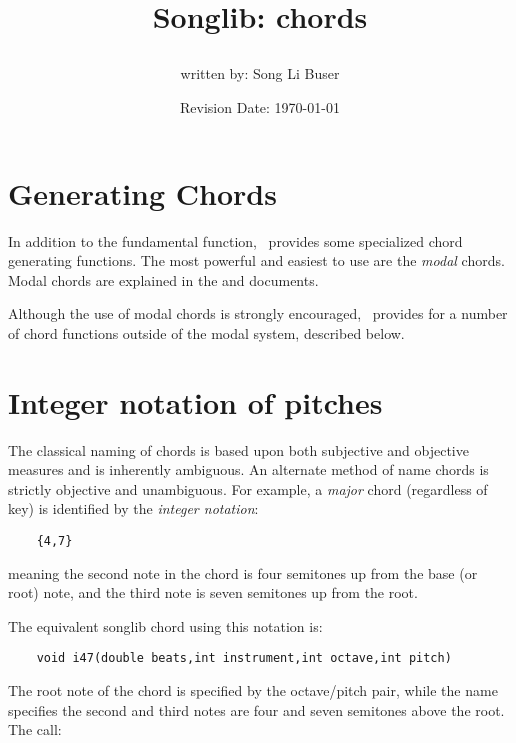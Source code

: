 \documentclass{article}
\title{Songlib: chords\\
\date{Revision Date: \today}}
\author{written by: Song Li Buser}
\begin{document}
\maketitle

\W\subsubsection*{}
\W\htmlrule

\section*{Generating Chords}

In addition to the fundamental  function,
\songlib\ provides some specialized chord generating
functions. The most powerful and easiest to use 
are the {\it modal} chords. Modal chords are explained in
the 
and  documents.

Although the use of modal chords is strongly encouraged, \songlib\
provides for a number of chord functions outside of the modal
system, described below.

\section*{Integer notation of pitches}

The classical naming of chords is based upon both
subjective and objective measures and is inherently
ambiguous. An alternate method of name chords is 
strictly objective and unambiguous. For example,
a {\it major} chord (regardless of key) is identified
by the {\it integer notation}:

\begin{verbatim}
    {4,7}
\end{verbatim}

meaning 
the second note in the chord is four semitones up from the 
base (or root) note, and the third note is seven
semitones up from the root.

The equivalent songlib chord using this notation
is:

\begin{verbatim}
    void i47(double beats,int instrument,int octave,int pitch)
\end{verbatim}

The root note of the chord is specified by the octave/pitch pair,
while the name specifies the second and third notes are four
and seven semitones above the root.
The call:
\end{document}
